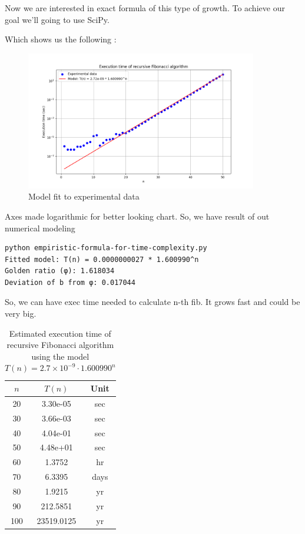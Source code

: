\documentclass{article}
\begin{document}
%

Now we are interested in exact formula of this type of growth. To achieve our goal we'll going to use SciPy.


Which shows us the following : 
\begin{figure}[H]
	\centering
	\includegraphics[width=0.9\textwidth]{./recursive-time-exec/experimental-data-formula.png}
	\caption{Model fit to experimental data}
	\label{fig:experimental_vs_theoretical}
\end{figure}

Axes made logarithmic for better looking chart.
So, we have result of out numerical modeling 
\begin{verbatim}
python empiristic-formula-for-time-complexity.py
Fitted model: T(n) = 0.0000000027 * 1.600990^n
Golden ratio (φ): 1.618034
Deviation of b from φ: 0.017044
\end{verbatim}

So, we can have exec time needed to calculate n-th fib. It grows fast and could be very big.

\begin{table}[h]
	\centering
	\caption{Estimated execution time of recursive Fibonacci algorithm using the model $T(n) = 2.7 \times 10^{-9} \cdot 1.600990^n$}
	\begin{tabular}{|c|c|c|}
		\hline
		$n$ & $T(n)$ & Unit \\
		\hline
		20 & 3.30e-05 & sec \\ 
		\hline
		30 & 3.66e-03 & sec \\ 
		\hline
		40 & 4.04e-01 & sec \\ 
		\hline
		50 & 4.48e+01 & sec \\ 
		\hline
		60 & 1.3752 & hr \\ 
		\hline
		70 & 6.3395 & days \\ 
		\hline
		80 & 1.9215 & yr \\ 
		\hline
		90 & 212.5851 & yr \\ 
		\hline
		100 & 23519.0125 & yr \\ 
		\hline
		
	\end{tabular}
\end{table}
\end{document}
